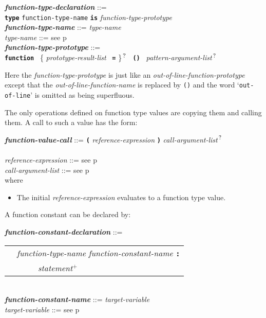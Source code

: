 \documentclass[12pt]{article}
\newcommand{\TT}[1]{{\tt \bfseries #1}}
\newcommand{\PLUS}[1][]{{$^{+#1}$}}
\newcommand{\QMARK}{{$^{\,\mbox{\footnotesize ?}}$}}
\newcommand{\ttkey}[1]{{\tt \bfseries #1}}
\newcommand{\emkey}[1]{{\em \bfseries #1}}
\newcommand{\pagref}[1]{p\pageref{#1}}
\newenvironment{indpar}[1][0.3in]%
	{\begin{list}{}%
		     {\setlength{\itemsep}{0in}%
		      \setlength{\topsep}{0in}%
		      \setlength{\parsep}{1ex}%
		      \setlength{\labelwidth}{#1}%
		      \setlength{\leftmargin}{#1}%
		      \addtolength{\leftmargin}{\labelsep}}%
	 \item}%
	{\end{list}}
\begin{document}
\begin{indpar}
\emkey{function-type-declaration}\label{FUNCTION-TYPE-DECLARATION} ::= \\
\hspace*{0.5in}
    \ttkey{type} {\tt function-type-name} \TT{is}
                 {\em function-type-prototype}
\\[0.5ex]
\emkey{function-type-name} ::= {\em type-name}
\\[0.5ex]
{\em type-name} ::= see \pagref{TYPE-NAME}
\\[0.5ex]
\emkey{function-type-prototype}%
	\label{FUNCTION-TYPE-PROTOTYPE} ::= \\
\hspace*{0.25in} \ttkey{function}~
        \{ {\em prototype-result-list}~ \TT{=} \}\QMARK{}~
	\TT{()}~ {\em pattern-argument-list}\QMARK{}
\end{indpar}

Here the {\em function-type-prototype} is just like an
{\em out-of-line-function-prototype} except that the
{\em out-of-line-function-name} is replaced by {\tt ()} and
the word `{\tt out-of-line}' is omitted as being superfluous.

The only operations defined on function type values are copying them and
calling them.  A call to such a value has the form:
\begin{indpar}
\emkey{function-value-call}\label{FUNCTION-VALUE-CALL} ::=
	\TT{(} {\em reference-expression} \TT{)}
	     {\em call-argument-list}\QMARK{} \\
\\[0.5ex]
{\em reference-expression} ::= see \pagref{REFERENCE-EXPRESSION}
\\[0.5ex]
{\em call-argument-list} ::= see \pagref{CALL-ARGUMENT-LIST}
\\[1ex]
where
\begin{itemize}
\item The initial {\em reference-expression} evaluates to a function type value.
\end{itemize}
\end{indpar}

A function constant can be declared by:
\begin{indpar}
\emkey{function-constant-declaration}%
    \label{FUNCTION-CONSTANT-DECLARATION} ::= \\
\hspace*{0.5in}
    \begin{tabular}[t]{rl}
        &  {\em function-type-name} {\em function-constant-name} \TT{:} \\
	& \TT{~~~~~}{\em statement}\PLUS{} \\
    \end{tabular}
\\[0.5ex]
\emkey{function-constant-name} ::= {\em target-variable}
\\[0.5ex]
{\em target-variable} ::= see \pagref{TARGET-VARIABLE}
\end{indpar}
\end{document}
